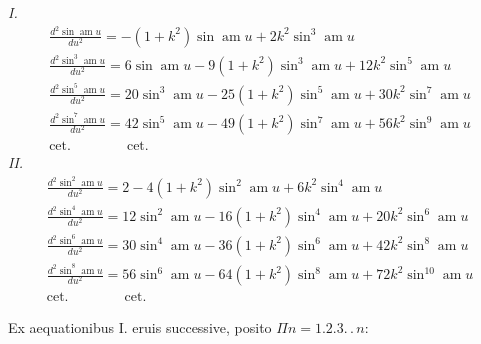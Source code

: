 \documentclass{article}
\begin{document}
\emph{I.}
\[
\begin{gathered}
\frac{d^{2}\sin\operatorname{am}u}{du^{2}}=-(1+k^{2})\sin\operatorname{am}u+2k^{2}\sin^{3}\operatorname{am}u\\[1.5ex]
\frac{d^{2}\sin^{3}\operatorname{am}u}{du^{2}}=6\sin\operatorname{am}u-9(1+k^{2})\sin^{3}\operatorname{am}u+12k^{2}\sin^{5}\operatorname{am}u\\[1.5ex]
\frac{d^{2}\sin^{5}\operatorname{am}u}{du^{2}}=20\sin^{3}\operatorname{am}u-25(1+k^{2})\sin^{5}\operatorname{am}u+30k^{2}\sin^{7}\operatorname{am}u\\[1.5ex]
\frac{d^{2}\sin^{7}\operatorname{am}u}{du^{2}}=42\sin^{5}\operatorname{am}u-49(1+k^{2})\sin^{7}\operatorname{am}u+56k^{2}\sin^{9}\operatorname{am}u\\[1.5ex]
\text{cet.}\qquad\qquad\text{cet.}
\end{gathered}
\]
\emph{II.}
\[
\begin{gathered}
\frac{d^{2}\sin^{2}\operatorname{am}u}{du^{2}}=2-4(1+k^{2})\sin^{2}\operatorname{am}u+6k^{2}\sin^{4}\operatorname{am}u\\[1.5ex]
\frac{d^{2}\sin^{4}\operatorname{am}u}{du^{2}}=12\sin^{2}\operatorname{am}u-16(1+k^{2})\sin^{4}\operatorname{am}u+20k^{2}\sin^{6}\operatorname{am}u\\[1.5ex]
\frac{d^{2}\sin^{6}\operatorname{am}u}{du^{2}}=30\sin^{4}\operatorname{am}u-36(1+k^{2})\sin^{6}\operatorname{am}u+42k^{2}\sin^{8}\operatorname{am}u\\[1.5ex]
\frac{d^{2}\sin^{8}\operatorname{am}u}{du^{2}}=56\sin^{6}\operatorname{am}u-64(1+k^{2})\sin^{8}\operatorname{am}u+72k^{2}\sin^{10}\operatorname{am}u\\[1.5ex]
\text{cet.}\qquad\qquad\text{cet.}
\end{gathered}
\]


Ex aequationibus I. eruis successive, posito $\Pi n=1.2.3.\,.\,n$:
\end{document}
